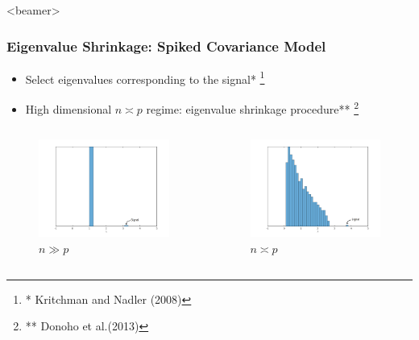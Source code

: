 \documentclass{beamer}
\newcommand\blfootnote[1]{%
  \begingroup
  \renewcommand\thefootnote{}\footnote{#1}%
  \addtocounter{footnote}{-1}%
  \endgroup
}
\begin{document}
\begin{frame}<beamer>
\frametitle{Eigenvalue Shrinkage: Spiked Covariance Model}
\begin{itemize}[]
\item Select eigenvalues corresponding to the signal* \blfootnote{* Kritchman and Nadler (2008)}
\item High dimensional $n \asymp p$ regime: eigenvalue 
shrinkage procedure**\blfootnote{** Donoho et al.(2013)} 
\end{itemize}
\begin{columns}
\begin{figure}
\centering
\includegraphics[width=1\linewidth]{figures/mpplot_clt.png}
\caption{$n \gg p$}
\end{figure}
\begin{figure}
\includegraphics[width=1\linewidth]{figures/mpplot_high.png}
\caption{$n \asymp p$}
\label{fig:shrinkage}
\end{figure}
\end{columns}
\end{frame}
\end{document}
